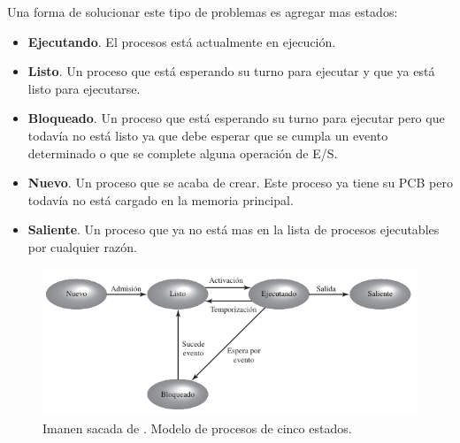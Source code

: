 \documentclass[12pt]{article}
\begin{document}
  Una forma de solucionar este tipo de problemas es agregar mas estados:
  \begin{itemize}
    \item \textbf{Ejecutando}. El procesos está actualmente en ejecución.

    \item \textbf{Listo}. Un proceso que está esperando su turno para ejecutar y que ya está listo para ejecutarse.

    \item \textbf{Bloqueado}. Un proceso que está esperando su turno para ejecutar pero que todavía no está listo ya que debe esperar que se cumpla un evento determinado o que se complete alguna operación de E/S.

    \item \textbf{Nuevo}. Un proceso que se acaba de crear. Este proceso ya tiene su PCB pero todavía no está cargado en la memoria principal.

    \item \textbf{Saliente}. Un proceso que ya no está mas en la lista de procesos ejecutables por cualquier razón.
  \end{itemize}

  \begin{figure}[H]
    \centering
    \includegraphics[width=\linewidth]{imagenes/procesos-cinco-estados.png}
    \caption{Imanen sacada de \parencite{sostallings}. Modelo de procesos de cinco estados.}
    \label{fig:proc-cinco-estados}
  \end{figure}
\end{document}
